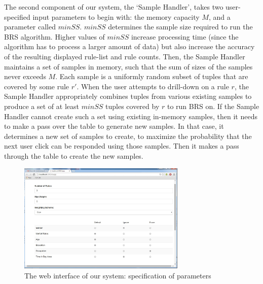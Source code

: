  The second component of our system, the `Sample Handler', takes two user-specified input parameters to begin with: the memory capacity $M$, and a parameter called $minSS$. $minSS$ determines the sample size required to run the BRS algorithm. Higher values of $minSS$ increase processing time (since the algorithm has to process a larger amount of data) but also increase the accuracy of the resulting displayed rule-list and rule counts. Then, the Sample Handler maintains a set of samples in memory, such that the sum of sizes of the samples never exceeds $M$. Each sample is a uniformly random subset of tuples that are covered by some rule $r'$. When the user attempts to drill-down on a rule $r$, the Sample Handler appropriately combines tuples from various existing samples to produce a set of at least $minSS$ tuples covered by $r$ to run BRS on. If the Sample Handler cannot create such a set using existing in-memory samples, then it needs to make a pass over the table to generate new samples. In that case, it determines a new set of samples to create, to maximize the probability that the next user click can be responded using those samples. Then it makes a pass through the table to create the new samples. 


\begin{figure}[ht]
\vspace{-5pt}
\centering
\includegraphics[width=80mm,frame]{graphs/uiscreenshot.jpg}
\vspace{-5pt}
\caption{The web interface of our system: specification of parameters \label{fig:interface}}
\vspace{-5pt}
\end{figure}

